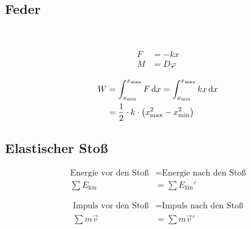 \subsection{Feder}

\begin{boxleft}
\\
\end{boxleft}\begin{boxrightshaded}
\begin{align}
F&=-kx\\
M&=D\varphi
\end{align}
\end{boxrightshaded}

\begin{boxleft}
\end{boxleft}\begin{boxrightshaded}
\begin{align}
W	&=\int_{x_\text{min}}^{x_\text{max}}F\mathop{}\!\mathrm{d} x=\int_{x_\text{min}}^{x_\text{max}}kx\mathop{}\!\mathrm{d} x\\
	&=\frac{1}{2}\cdot k\cdot \left(x_{\text{max}}^2-x_{\text{min}}^2\right)
\end{align}
\end{boxrightshaded}

\subsection{Elastischer Stoß}

\begin{boxleft}
\end{boxleft}\begin{boxrightshaded}
\begin{align}
\text{Energie vor den Stoß} &= \text{Energie nach den Stoß}\nonumber\\
\sum E_{\text{kin}}&=\sum E_{\text{kin}}'
\end{align}
\end{boxrightshaded}

\begin{boxleft}
\end{boxleft}\begin{boxrightshaded}
\begin{align}
\text{Impuls vor den Stoß} &= \text{Impuls nach den Stoß}\nonumber\\
\sum m\vec{v}&= \sum m\vec{v}'
\end{align}
\end{boxrightshaded}

